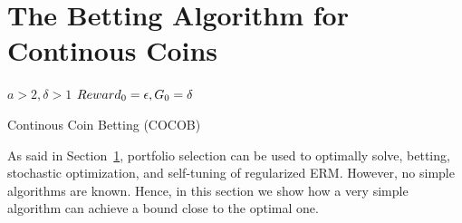 \section{The Betting Algorithm for Continous Coins}

\begin{algorithm}[t]
  \begin{algorithmic}
  {
     $a>2,\delta>1$
     $Reward_0=\epsilon,G_0=\delta$
    \ENDFOR
  }
  \end{algorithmic}
  \caption{Continous Coin Betting (COCOB)}
  \label{alg:cocob}
\end{algorithm}

As said in Section~\ref{}, portfolio selection can be used to optimally solve, betting, stochastic optimization, and self-tuning of regularized \ac{ERM}. However, no simple algorithms are known.
Hence, in this section we show how a very simple algorithm can achieve a bound close to the optimal one.

